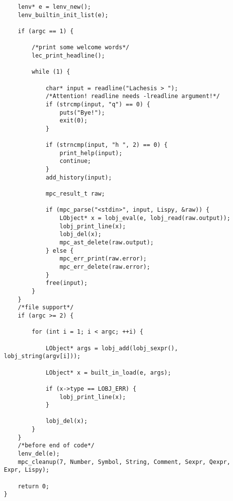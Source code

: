 \documentclass[UTF8]{ctexart}
\begin{document}
\begin{lstlisting}
    lenv* e = lenv_new();
    lenv_builtin_init_list(e);

    if (argc == 1) {

        /*print some welcome words*/
        lec_print_headline();

        while (1) {

            char* input = readline("Lachesis > ");
            /*Attention! readline needs -lreadline argument!*/
            if (strcmp(input, "q") == 0) {
                puts("Bye!");
                exit(0);
            }

            if (strncmp(input, "h ", 2) == 0) {
                print_help(input);
                continue;
            }
            add_history(input);

            mpc_result_t raw;

            if (mpc_parse("<stdin>", input, Lispy, &raw)) {
                LObject* x = lobj_eval(e, lobj_read(raw.output));
                lobj_print_line(x);
                lobj_del(x);
                mpc_ast_delete(raw.output);
            } else {
                mpc_err_print(raw.error);
                mpc_err_delete(raw.error);
            }
            free(input);
        }
    }
    /*file support*/
    if (argc >= 2) {

        for (int i = 1; i < argc; ++i) {

            LObject* args = lobj_add(lobj_sexpr(), lobj_string(argv[i]));

            LObject* x = built_in_load(e, args);

            if (x->type == LOBJ_ERR) {
                lobj_print_line(x);
            }

            lobj_del(x);
        }
    }
    /*before end of code*/
    lenv_del(e);
    mpc_cleanup(7, Number, Symbol, String, Comment, Sexpr, Qexpr, Expr, Lispy);

    return 0;
}


\end{lstlisting}
\end{document}
